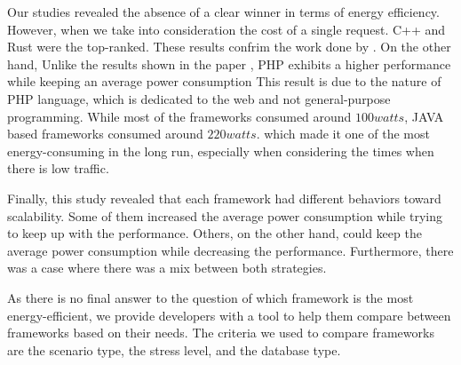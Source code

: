 Our studies revealed the absence of a clear winner in terms of energy efficiency. However, when we take into consideration the cost of a single request. C++ and Rust were the top-ranked. These results confrim the work done by \citeauthor{pereira_energy_2017}. On the other hand, Unlike the results shown in the paper \cite{pereira_energy_2017}, \textsf{PHP} exhibits a higher performance while keeping an average power consumption 
This result is due to the nature of \textsf{PHP} language, which is dedicated to the web and not general-purpose programming. 
While most of the frameworks consumed around $100 watts$, \textsf{JAVA} based frameworks consumed around $220 watts$. which made it one of the most energy-consuming in the long run, especially when considering the times when there is low traffic.  

Finally, this study revealed that each framework had different behaviors toward scalability. Some of them increased the average power consumption while trying to keep up with the performance. Others, on the other hand, could keep the average power consumption while decreasing the performance. Furthermore, there was a case where there was a mix between both strategies. 

As there is no final answer to the question of which framework is the most energy-efficient, we provide developers with a tool to help them compare between frameworks based on their needs. The criteria we used to compare frameworks are the scenario type, the stress level, and the database type.

